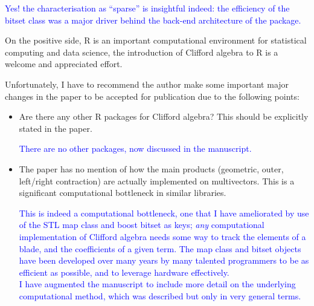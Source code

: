 \documentclass{article}
\begin{document}
\textcolor{blue}{Yes! the characterisation as ``sparse'' is insightful
  indeed: the efficiency of the bitset class was a major driver behind
  the back-end architecture of the package.}

On the positive side, R is an important computational environment for
statistical computing and data science, the introduction of Clifford
algebra to R is a welcome and appreciated effort.

Unfortunately, I have to recommend the author make some important
major changes in the paper to be accepted for publication due to the
following points:

\begin{itemize}
  \item Are there any other R packages for Clifford algebra? This
    should be explicitly stated in the paper.

    \textcolor{blue}{There are no other packages, now discussed in the
      manuscript.}
  \item The paper has no mention of how the main products (geometric,
    outer, left/right contraction) are actually implemented on
    multivectors. This is a significant computational bottleneck in
    similar libraries.

    \textcolor{blue}{This is indeed a computational bottleneck, one
      that I have ameliorated by use of the STL map class and boost
      bitset as keys; {\em any} computational implementation of
      Clifford algebra needs some way to track the elements of a
      blade, and the coefficients of a given term.  The map class and
      bitset objects have been developed over many years by many
      talented programmers to be as efficient as possible, and to
      leverage hardware effectively.\\ I have augmented the manuscript
      to include more detail on the underlying computational method,
      which was described but only in very general terms.}


\end{itemize}
\end{document}

